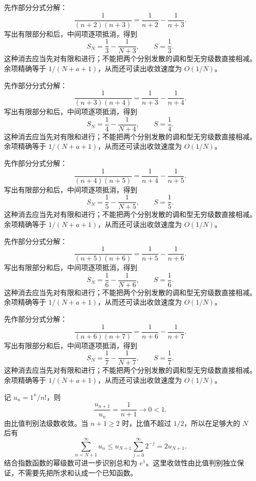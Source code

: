 \documentclass[12pt,fontset=fandol]{ctexart}
\begin{document}
\begin{solve}\label{ans:c24q8}
先作部分分式分解：
\[
\frac1{(n+2)(n+3)}=\frac1{n+2}-\frac1{n+3}.
\]
写出有限部分和后，中间项逐项抵消，得到
\[
S_N=\frac1{3}-\frac1{N+3},\qquad S=\frac{1}{3}.
\]
这种消去应当先对有限和进行；不能把两个分别发散的调和型无穷级数直接相减。余项精确等于 $1/(N+a+1)$，从而还可读出收敛速度为 $O(1/N)$。
\end{solve}

\begin{solve}\label{ans:c24q9}
先作部分分式分解：
\[
\frac1{(n+3)(n+4)}=\frac1{n+3}-\frac1{n+4}.
\]
写出有限部分和后，中间项逐项抵消，得到
\[
S_N=\frac1{4}-\frac1{N+4},\qquad S=\frac{1}{4}.
\]
这种消去应当先对有限和进行；不能把两个分别发散的调和型无穷级数直接相减。余项精确等于 $1/(N+a+1)$，从而还可读出收敛速度为 $O(1/N)$。
\end{solve}

\begin{solve}\label{ans:c24q10}
先作部分分式分解：
\[
\frac1{(n+4)(n+5)}=\frac1{n+4}-\frac1{n+5}.
\]
写出有限部分和后，中间项逐项抵消，得到
\[
S_N=\frac1{5}-\frac1{N+5},\qquad S=\frac{1}{5}.
\]
这种消去应当先对有限和进行；不能把两个分别发散的调和型无穷级数直接相减。余项精确等于 $1/(N+a+1)$，从而还可读出收敛速度为 $O(1/N)$。
\end{solve}

\begin{solve}\label{ans:c24q11}
先作部分分式分解：
\[
\frac1{(n+5)(n+6)}=\frac1{n+5}-\frac1{n+6}.
\]
写出有限部分和后，中间项逐项抵消，得到
\[
S_N=\frac1{6}-\frac1{N+6},\qquad S=\frac{1}{6}.
\]
这种消去应当先对有限和进行；不能把两个分别发散的调和型无穷级数直接相减。余项精确等于 $1/(N+a+1)$，从而还可读出收敛速度为 $O(1/N)$。
\end{solve}

\begin{solve}\label{ans:c24q12}
先作部分分式分解：
\[
\frac1{(n+6)(n+7)}=\frac1{n+6}-\frac1{n+7}.
\]
写出有限部分和后，中间项逐项抵消，得到
\[
S_N=\frac1{7}-\frac1{N+7},\qquad S=\frac{1}{7}.
\]
这种消去应当先对有限和进行；不能把两个分别发散的调和型无穷级数直接相减。余项精确等于 $1/(N+a+1)$，从而还可读出收敛速度为 $O(1/N)$。
\end{solve}

\begin{solve}\label{ans:c24q13}
记 $u_n=1^n/n!$，则
\[
\frac{u_{n+1}}{u_n}=\frac{1}{n+1}\longrightarrow0<1.
\]
由比值判别法级数收敛。当 $n+1\ge 2$ 时，比值不超过 $1/2$，所以在足够大的 $N$ 后有
\[
\sum_{n=N+1}^\infty u_n\le u_{N+1}\sum_{j=0}^\infty2^{-j}=2u_{N+1}.
\]
结合指数函数的幂级数可进一步识别总和为 $e^{1}$。这里收敛性由比值判别独立保证，不需要先把所求和认成一个已知函数。
\end{solve}
\end{document}
